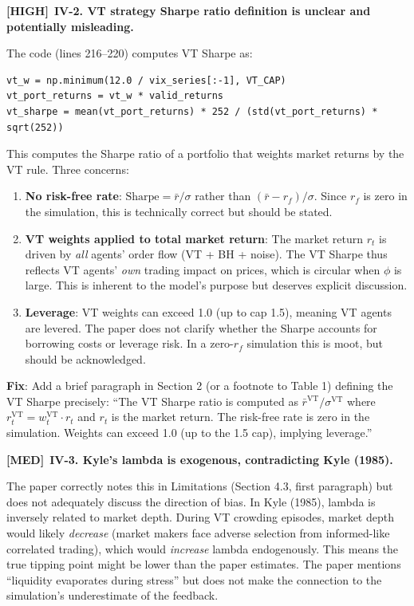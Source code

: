 \documentclass[12pt,a4paper]{article}
\newcommand{\HIGH}{\textbf{\textcolor{errorred}{[HIGH]}}}
\newcommand{\MED}{\textbf{\textcolor{warncolor}{[MED]}}}
\begin{document}
\medskip

\HIGH\ \textbf{IV-2. VT strategy Sharpe ratio definition is unclear and potentially misleading.}

The code (lines 216--220) computes VT Sharpe as:
\begin{verbatim}
vt_w = np.minimum(12.0 / vix_series[:-1], VT_CAP)
vt_port_returns = vt_w * valid_returns
vt_sharpe = mean(vt_port_returns) * 252 / (std(vt_port_returns) * sqrt(252))
\end{verbatim}

This computes the Sharpe ratio of a portfolio that weights market returns by the VT rule. Three concerns:

\begin{enumerate}[label=(\alph*)]
  \item \textbf{No risk-free rate}: $\text{Sharpe} = \bar{r}/\sigma$ rather than $(\bar{r} - r_f)/\sigma$. Since $r_f$ is zero in the simulation, this is technically correct but should be stated.
  \item \textbf{VT weights applied to total market return}: The market return $r_t$ is driven by \emph{all} agents' order flow (VT + BH + noise). The VT Sharpe thus reflects VT agents' \emph{own} trading impact on prices, which is circular when $\phi$ is large. This is inherent to the model's purpose but deserves explicit discussion.
  \item \textbf{Leverage}: VT weights can exceed 1.0 (up to cap 1.5), meaning VT agents are levered. The paper does not clarify whether the Sharpe accounts for borrowing costs or leverage risk. In a zero-$r_f$ simulation this is moot, but should be acknowledged.
\end{enumerate}

\textbf{Fix}: Add a brief paragraph in Section 2 (or a footnote to Table 1) defining the VT Sharpe precisely: ``The VT Sharpe ratio is computed as $\bar{r}^{\text{VT}} / \sigma^{\text{VT}}$ where $r^{\text{VT}}_t = w^{\text{VT}}_t \cdot r_t$ and $r_t$ is the market return. The risk-free rate is zero in the simulation. Weights can exceed 1.0 (up to the 1.5 cap), implying leverage.''

\medskip

\MED\ \textbf{IV-3. Kyle's lambda is exogenous, contradicting Kyle (1985).}

The paper correctly notes this in Limitations (Section 4.3, first paragraph) but does not adequately discuss the direction of bias. In Kyle (1985), lambda is inversely related to market depth. During VT crowding episodes, market depth would likely \emph{decrease} (market makers face adverse selection from informed-like correlated trading), which would \emph{increase} lambda endogenously. This means the true tipping point might be lower than the paper estimates. The paper mentions ``liquidity evaporates during stress'' but does not make the connection to the simulation's underestimate of the feedback.
\end{document}
